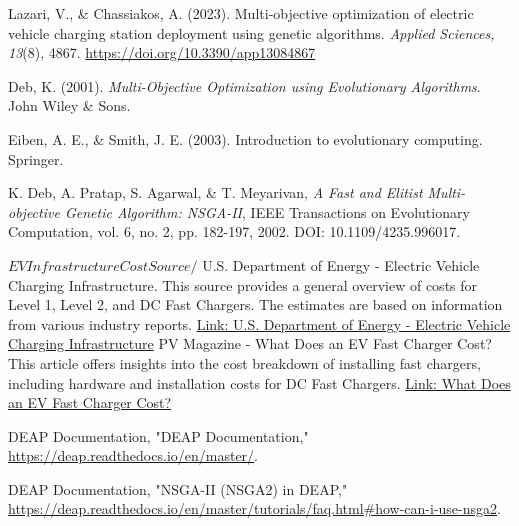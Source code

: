 \begin{thebibliography}{99}
    Lazari, V., \& Chassiakos, A. (2023). Multi-objective optimization of electric vehicle charging station deployment using genetic algorithms. \textit{Applied Sciences, 13}(8), 4867. \url{https://doi.org/10.3390/app13084867}

    Deb, K. (2001). \textit{Multi-Objective Optimization using Evolutionary Algorithms}. John Wiley \& Sons.

     Eiben, A. E., \& Smith, J. E. (2003). Introduction to evolutionary computing. Springer.

     K. Deb, A. Pratap, S. Agarwal, \& T. Meyarivan, \textit{A Fast and Elitist Multi-objective Genetic Algorithm: NSGA-II}, IEEE Transactions on Evolutionary Computation, vol. 6, no. 2, pp. 182-197, 2002. DOI: 10.1109/4235.996017.


    

    $
    EV Infrastructure Cost Source 
    /$
     U.S. Department of Energy - Electric Vehicle Charging Infrastructure. This source provides a general overview of costs for Level 1, Level 2, and DC Fast Chargers. The estimates are based on information from various industry reports. \href{https://www.energy.gov/eere/vehicles/ev-charging-infrastructure}{Link: U.S. Department of Energy - Electric Vehicle Charging Infrastructure}
     PV Magazine - What Does an EV Fast Charger Cost? This article offers insights into the cost breakdown of installing fast chargers, including hardware and installation costs for DC Fast Chargers. \href{https://www.pv-magazine.com/2021/10/18/what-does-an-ev-fast-charger-cost/}{Link: What Does an EV Fast Charger Cost?}

     DEAP Documentation, "DEAP Documentation," \url{https://deap.readthedocs.io/en/master/}.
    
     DEAP Documentation, "NSGA-II (NSGA2) in DEAP," \url{https://deap.readthedocs.io/en/master/tutorials/faq.html\#how-can-i-use-nsga2}.


\end{thebibliography}
